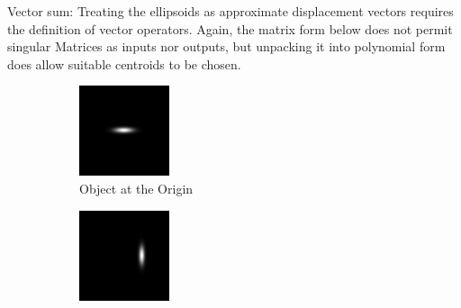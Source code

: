 \documentclass[a4paper, 11pt, titlepage]{article}
\begin{document}
      Vector sum:
        Treating the ellipsoids as approximate displacement vectors requires the definition of vector operators.
        Again, the matrix form below does not permit singular Matrices as inputs nor outputs, but unpacking it into polynomial form does allow suitable centroids to be chosen.
      \begin{figure}
      \centering
      \begin{subfigure}{.3\textwidth}
        \centering
        \includegraphics[width=.8\linewidth]{images/GaussianSum1.png}
        \caption{Object at the Origin}
        \label{fig:vectSumsub1}
      \end{subfigure}%
      \begin{subfigure}{.3\textwidth}
        \centering
        \includegraphics[width=.8\linewidth]{images/GaussianSum2.png}

\end{subfigure}
\end{figure}
\end{document}
